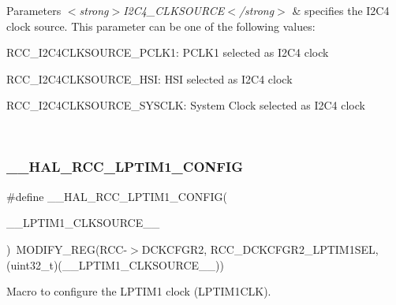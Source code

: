 \begin{DoxyParams}{Parameters}
{\em $<$strong$>$\+I2\+C4\+\_\+\+C\+L\+K\+S\+O\+U\+R\+C\+E$<$/strong$>$} & specifies the I2\+C4 clock source. This parameter can be one of the following values\+: \begin{DoxyItemize}
\item R\+C\+C\+\_\+\+I2\+C4\+C\+L\+K\+S\+O\+U\+R\+C\+E\+\_\+\+P\+C\+L\+K1\+: P\+C\+L\+K1 selected as I2\+C4 clock \item R\+C\+C\+\_\+\+I2\+C4\+C\+L\+K\+S\+O\+U\+R\+C\+E\+\_\+\+H\+SI\+: H\+SI selected as I2\+C4 clock \item R\+C\+C\+\_\+\+I2\+C4\+C\+L\+K\+S\+O\+U\+R\+C\+E\+\_\+\+S\+Y\+S\+C\+LK\+: System Clock selected as I2\+C4 clock \end{DoxyItemize}
\\
\hline
\end{DoxyParams}
\mbox{\label{group___r_c_c_ex___exported___macros_ga2a59d733248c7e8f36c2c6abd1dd2bb4}} 
\subsubsection{\texorpdfstring{\_\_HAL\_RCC\_LPTIM1\_CONFIG}{\_\_HAL\_RCC\_LPTIM1\_CONFIG}}
{\footnotesize\ttfamily \#define \+\_\+\+\_\+\+H\+A\+L\+\_\+\+R\+C\+C\+\_\+\+L\+P\+T\+I\+M1\+\_\+\+C\+O\+N\+F\+IG(\begin{DoxyParamCaption}\item[{}]{\+\_\+\+\_\+\+L\+P\+T\+I\+M1\+\_\+\+C\+L\+K\+S\+O\+U\+R\+C\+E\+\_\+\+\_\+ }\end{DoxyParamCaption})~M\+O\+D\+I\+F\+Y\+\_\+\+R\+EG(R\+CC-\/$>$D\+C\+K\+C\+F\+G\+R2, R\+C\+C\+\_\+\+D\+C\+K\+C\+F\+G\+R2\+\_\+\+L\+P\+T\+I\+M1\+S\+EL, (uint32\+\_\+t)(\+\_\+\+\_\+\+L\+P\+T\+I\+M1\+\_\+\+C\+L\+K\+S\+O\+U\+R\+C\+E\+\_\+\+\_\+))}



Macro to configure the L\+P\+T\+I\+M1 clock (L\+P\+T\+I\+M1\+C\+LK). 


